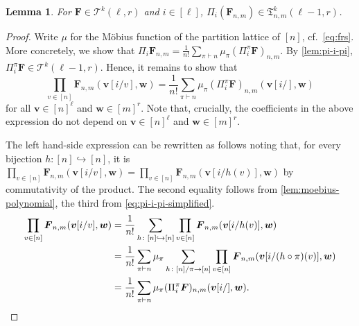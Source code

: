 \documentclass[10pt,a4paper]{article}
\theoremstyle{definition}
\newtheorem{example}[definition]{Example}
\theoremstyle{plain}
\newtheorem{lemma}[definition]{Lemma}
\theoremstyle{remark}
\begin{document}
	\begin{lemma}\label{lem:product-one-graph}
		For $\boldsymbol{F} \in \mathcal{T}^k(\ell, r)$ and $i \in [\ell]$,
		 $\Pi_i (\boldsymbol{F}_{n,m}) \in \mathfrak{T}^k_{n, m}(\ell-1, r)$.
	\end{lemma}
	\begin{proof}
		Write $\mu$ for the Möbius function of the partition lattice of $[n]$, cf.\ \cref{eq:frs}.
		More concretely, 
		we show that $\Pi_i \boldsymbol{F}_{n,m} = \frac{1}{n!} \sum_{\pi \vdash n} \mu_\pi (\Pi_i^\pi \boldsymbol{F})_{n,m}$.
		By \cref{lem:pi-i-pi},  $\Pi^\pi_i\boldsymbol{F} \in \mathcal{T}^k(\ell-1, r)$.
		Hence, it remains to show that
		\[
		\prod_{v \in [n]} \boldsymbol{F}_{n,m}(\boldsymbol{v}[i/v], \boldsymbol{w})
		=  \frac{1}{n!} \sum_{\pi \vdash n} \mu_{\pi} (\Pi^\pi_i\boldsymbol{F})_{n, m}(\boldsymbol{v}[i/], \boldsymbol{w})
		\]
		for all $\boldsymbol{v} \in [n]^\ell$ and $\boldsymbol{w} \in [m]^r$.
		Note that, crucially, the coefficients in the above expression do not depend on $\boldsymbol{v} \in [n]^\ell$ and $\boldsymbol{w} \in [m]^r$.
		
		 
		
		The left hand-side expression can be rewritten as follows noting that, for every bijection $h \colon [n] \hookrightarrow [n]$, it is 
		$\prod_{v \in [n]} \boldsymbol{F}_{n,m}(\boldsymbol{v}[i/v], \boldsymbol{w}) = \prod_{v \in [n]} \boldsymbol{F}_{n,m}(\boldsymbol{v}[i/h(v)], \boldsymbol{w})$
		by commutativity of the product.
		The second equality follows from \cref{lem:moebius-polynomial},
		the third from \cref{eq:pi-i-pi-simplified}.
		\begin{align*}
			\prod_{v \in [n]} \boldsymbol{F}_{n,m}(\boldsymbol{v}[i/v], \boldsymbol{w})
			&= \frac{1}{n!} \sum_{h \colon [n] \hookrightarrow [n]} \prod_{v \in [n]} \boldsymbol{F}_{n,m}(\boldsymbol{v}[i/h(v)], \boldsymbol{w}) \\
			&= \frac{1}{n!} \sum_{\pi \vdash n} \mu_\pi \sum_{h \colon [n]/\pi \to [n]} \prod_{v \in [n]} \boldsymbol{F}_{n,m}(\boldsymbol{v}[i/(h \circ \pi)(v)], \boldsymbol{w}) \\
			&= \frac{1}{n!} \sum_{\pi \vdash n} \mu_\pi (\Pi^\pi_i \boldsymbol{F})_{n,m}(\boldsymbol{v}[i/], \boldsymbol{w}). \qedhere
		\end{align*}
	\end{proof}
%
\end{document}

